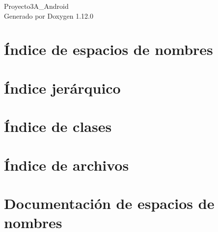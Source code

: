 \documentclass[twoside]{book}
\newcommand{\+}{\discretionary{\mbox{\scriptsize$\hookleftarrow$}}{}{}}
\newcommand{\clearemptydoublepage}{%
    \newpage{\pagestyle{empty}\cleardoublepage}%
  }
\begin{document}
  \raggedbottom
    \hypersetup{pageanchor=false,
                bookmarksnumbered=true,
                pdfencoding=unicode
               }
  \begin{titlepage}
  \vspace*{7cm}
  \begin{center}%
  {\Large Proyecto3\+A\+\_\+\+Android}\\
  \vspace*{1cm}
  {\large Generado por Doxygen 1.12.0}\\
  \end{center}
  \end{titlepage}
  \clearemptydoublepage
  \tableofcontents
  \clearemptydoublepage
  \hypersetup{pageanchor=true}

\chapter{Índice de espacios de nombres}

\chapter{Índice jerárquico}

\chapter{Índice de clases}

\chapter{Índice de archivos}

\chapter{Documentación de espacios de nombres}

\end{document}
